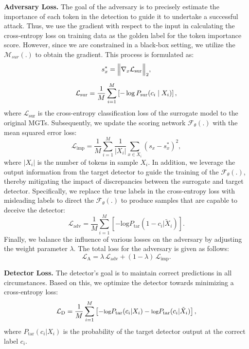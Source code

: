 \noindent\textbf{Adversary Loss.}
The goal of the adversary is to precisely estimate the importance of each token in the detection to guide it to undertake a successful attack.
Thus, we use the gradient with respect to the input in calculating the cross-entropy loss on training data as the golden label for the token importance score.
However, since we are constrained in a black-box setting, we utilize the $\mathcal{M}_{sur}(.)$ to obtain the gradient.
This process is formulated as:
\begin{equation}
\label{eq:combined}  
\vcenter{\hbox{$\displaystyle 
\begin{gathered}
s^*_x = \Bigl\|\nabla_{x} \mathcal{L}_{\text{sur}}\Bigr\|_2, \\[6pt]
\mathcal{L}_{\text{sur}} = \frac{1}{M} \sum_{i=1}^{M} \left[ -\log P_{\text{sur}}(c_{i} \mid X_{i})\right],
\end{gathered}
$}}
\end{equation}
where $\mathcal{L}_{\text{sur}}$ is the cross-entropy classification loss of the surrogate model to the original MGTs.
Subsequently, we update the scoring network $\mathcal{F}_{\theta}(.)$ with the mean squared error loss:
\begin{equation}
\label{eq:12}
    \mathcal{L}_{\text{imp}} = \frac{1}{M} \sum_{i=1}^{M} \frac{1}{|X_i|} \sum_{x \in X_i} (s_x-s_x^*)^{2},
\end{equation}
where $|X_i|$ is the number of tokens in sample $X_i$. 
In addition, we leverage the output information from the target detector to guide the training of the $\mathcal{F}_{\theta}(.)$, thereby mitigating the impact of discrepancies between the surrogate and target detector.
Specifically, we replace the true labels in the cross-entropy loss with misleading labels to direct the $\mathcal{F}_{\theta}(.)$ to produce samples that are capable to deceive the detector:
\begin{equation}
\label{eq:13}
    \mathcal{L}_{\text{adv}} = \frac{1}{M} \sum_{i=1}^{M} \left[ -\text{log}P_{\text{tar}}(1-c_{i}|\tilde{X}_{i})\right].
\end{equation}
Finally, we balance the influence of various losses on the adversary by adjusting the weight parameter $\lambda$. The total loss for the adversary is given as follows:
\begin{equation}
\label{eq:14}
\mathcal{L}_{\text{A}} = \lambda \, \mathcal{L}_{\text{adv}} + (1-\lambda) \, \mathcal{L}_{\text{imp}}.
\end{equation}

\noindent\textbf{Detector Loss.}
The detector's goal is to maintain correct predictions in all circumstances.
Based on this, we optimize the detector towards minimizing a cross-entropy loss:
\begin{equation}
\label{eq:9}
\footnotesize
    \mathcal{L}_{\text{D}} = \frac{1}{M} \sum_{i=1}^{M} \left[ -\text{log}P_{\text{tar}}(c_{i}|X_{i})-\text{log}P_{\text{tar}}(c_{i}|\tilde{X}_{i})\right],
\end{equation}
where $P_{\text{tar}}(c_{i}|X_{i})$ is the probability of the target detector output at the correct label $c_{i}$. 

